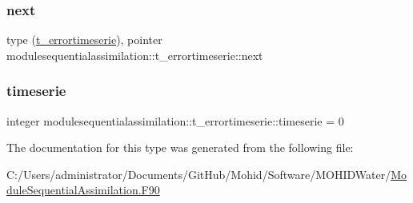 \subsubsection{\texorpdfstring{next}{next}}
{\footnotesize\ttfamily type (\mbox{\hyperlink{structmodulesequentialassimilation_1_1t__errortimeserie}{t\+\_\+errortimeserie}}), pointer modulesequentialassimilation\+::t\+\_\+errortimeserie\+::next\hspace{0.3cm}{\ttfamily [private]}}

\mbox{\label{structmodulesequentialassimilation_1_1t__errortimeserie_a2029ac2435807535a58bed6dec3c0683}} 
\subsubsection{\texorpdfstring{timeserie}{timeserie}}
{\footnotesize\ttfamily integer modulesequentialassimilation\+::t\+\_\+errortimeserie\+::timeserie = 0\hspace{0.3cm}{\ttfamily [private]}}



The documentation for this type was generated from the following file\+:\begin{DoxyCompactItemize}
\item 
C\+:/\+Users/administrator/\+Documents/\+Git\+Hub/\+Mohid/\+Software/\+M\+O\+H\+I\+D\+Water/\mbox{\hyperlink{_module_sequential_assimilation_8_f90}{Module\+Sequential\+Assimilation.\+F90}}\end{DoxyCompactItemize}
